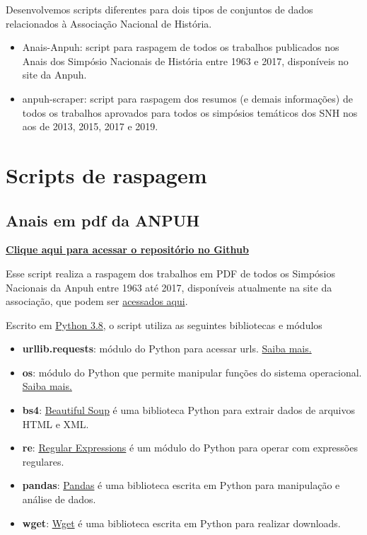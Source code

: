 \documentclass[
]{book}
\providecommand{\tightlist}{%
  \setlength{\itemsep}{0pt}\setlength{\parskip}{0pt}}
\begin{document}
Desenvolvemos scripts diferentes para dois tipos de conjuntos de dados relacionados à Associação Nacional de História.

\begin{itemize}
\item
  Anais-Anpuh: script para raspagem de todos os trabalhos publicados nos Anais dos Simpósio Nacionais de História entre 1963 e 2017, disponíveis no site da Anpuh.
\item
  anpuh-scraper: script para raspagem dos resumos (e demais informações) de todos os trabalhos aprovados para todos os simpósios temáticos dos SNH nos aos de 2013, 2015, 2017 e 2019.
\end{itemize}

\hypertarget{scripts-de-raspagem}{%
\section{Scripts de raspagem}\label{scripts-de-raspagem}}

\hypertarget{anais-em-pdf-da-anpuh}{%
\subsection{Anais em pdf da ANPUH}\label{anais-em-pdf-da-anpuh}}

\href{https://github.com/LABHDUFBA/Anais-Anpuh}{\textbf{Clique aqui para acessar o repositório no Github}}

Esse script realiza a raspagem dos trabalhos em PDF de todos os Simpósios Nacionais da Anpuh entre 1963 até 2017, disponíveis atualmente na site da associação, que podem ser \href{https://anpuh.org.br/index.php/documentos/anais}{acessados aqui}.

Escrito em \href{https://www.python.org/}{Python 3.8}, o script utiliza as seguintes bibliotecas e módulos

\begin{itemize}
\tightlist
\item
  \textbf{urllib.requests}: módulo do Python para acessar urls. \href{https://docs.python.org/pt-br/3/library/urllib.request.htmll}{Saiba mais.}
\item
  \textbf{os}: módulo do Python que permite manipular funções do sistema operacional. \href{https://docs.python.org/pt-br/3/library/os.html}{Saiba mais.}
\item
  \textbf{bs4}: \href{https://www.crummy.com/software/BeautifulSoup/bs4/doc/}{Beautiful Soup} é uma biblioteca Python para extrair dados de arquivos HTML e XML.
\item
  \textbf{re}: \href{https://docs.python.org/pt-br/3/library/re.html}{Regular Expressions} é um módulo do Python para operar com expressões regulares.
\item
  \textbf{pandas}: \href{https://pandas.pydata.org/}{Pandas} é uma biblioteca escrita em Python para manipulação e análise de dados.
\item
  \textbf{wget}: \href{https://pypi.org/project/wget/}{Wget} é uma biblioteca escrita em Python para realizar downloads.
\end{itemize}
\end{document}
